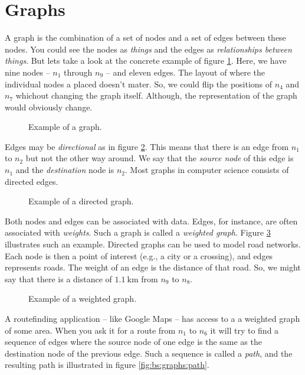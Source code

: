 \section{Graphs}

A graph is the combination of a set of nodes and a set of edges between these nodes. You could see the nodes as \textsl{things} and the edges as \textsl{relationships between things}. But lets take a look at the concrete example of figure \ref{fig:bs:graphs:graph}. Here, we have nine nodes -- $n_1$ through $n_9$ -- and eleven edges. The layout of where the individual nodes a placed doesn't mater. So, we could flip the positions of $n_4$ and $n_7$ whichout changing the graph itself. Although, the representation of the graph would obviously change.

\begin{figure}[tbp]
  
  \caption{Example of a graph.}
  \label{fig:bs:graphs:graph}
\end{figure}

Edges may be \textsl{directional} as in figure \ref{fig:bs:graphs:directed}. This means that there is an edge from $n_1$ to $n_2$ but not the other way around. We say that the \textsl{source node} of this edge is $n_1$ and the \textsl{destination} node is $n_2$. Most graphs in computer science consists of directed edges.

\begin{figure}[tbp]
  
  \caption{Example of a directed graph.}
  \label{fig:bs:graphs:directed}
\end{figure}

Both nodes and edges can be associated with data. Edges, for instance, are often associated with \textsl{weights}. Such a graph is called a \textsl{weighted graph}. Figure \ref{fig:bs:graphs:weighted} illustrates such an example. Directed graphs can be used to model road networks. Each node is then a point of interest (e.g., a city or a crossing), and edges represents roads. The weight of an edge is the distance of that road. So, we might say that there is a distance of $1.1~\mathrm{km}$ from $n_9$ to $n_8$.

\begin{figure}[tbp]
  
  \caption{Example of a weighted graph.}
  \label{fig:bs:graphs:weighted}
\end{figure}

A routefinding application -- like Google Maps -- has access to a a weighted graph of some area. When you ask it for a route from $n_1$ to $n_6$ it will try to find a sequence of edges where the source node of one edge is the same as the destination node of the previous edge. Such a sequence is called a \textsl{path}, and the resulting path is illustrated in figure \ref{fig:bs:graphs:path}.

